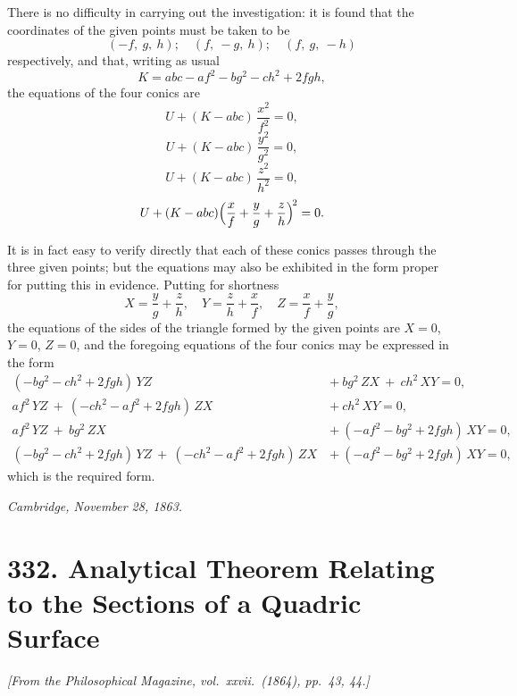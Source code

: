 \documentclass[11pt,a4paper]{article}
\theoremstyle{plain}
\begin{document}
There is no difficulty in carrying out the investigation: it is found that the coordinates of the given points must be taken to be
\[
(-f,\ g,\ h);\quad (f,\ -g,\ h);\quad (f,\ g,\ -h)
\]
respectively, and that, writing as usual
\[
K = abc - af^2 - bg^2 - ch^2 + 2fgh,
\]
the equations of the four conics are
\[
U + (K - abc)\,\frac{x^2}{f^2} = 0,
\]
\[
U + (K - abc)\,\frac{y^2}{g^2} = 0,
\]
\[
U + (K - abc)\,\frac{z^2}{h^2} = 0,
\]
\[
U + (K - abc)\Bigl(\frac{x}{f} + \frac{y}{g} + \frac{z}{h}\Bigr)^{\!2} = 0.
\]

It is in fact easy to verify directly that each of these conics passes through the three given points; but the equations may also be exhibited in the form proper for putting this in evidence. Putting for shortness
\[
X = \frac{y}{g} + \frac{z}{h},\quad Y = \frac{z}{h} + \frac{x}{f},\quad Z = \frac{x}{f} + \frac{y}{g},
\]
the equations of the sides of the triangle formed by the given points are $X = 0$, $Y = 0$, $Z = 0$, and the foregoing equations of the four conics may be expressed in the form
\begin{align*}
(-bg^2 - ch^2 + 2fgh)\,YZ\ &+\ bg^2\,ZX\ +\ ch^2\,XY = 0,\\[2pt]
af^2\,YZ\ +\ (-ch^2 - af^2 + 2fgh)\,ZX\ &+\ ch^2\,XY = 0,\\[2pt]
af^2\,YZ\ +\ bg^2\,ZX\ &+\ (-af^2 - bg^2 + 2fgh)\,XY = 0,\\[2pt]
(-bg^2 - ch^2 + 2fgh)\,YZ\ +\ (-ch^2 - af^2 + 2fgh)\,ZX\ &+\ (-af^2 - bg^2 + 2fgh)\,XY = 0,
\end{align*}
which is the required form.

\medskip
\noindent\textit{Cambridge, November 28, 1863.}

\newpage
\section*{332. Analytical Theorem Relating to the Sections of a Quadric Surface}

\noindent\textit{[From the Philosophical Magazine, vol.\ xxvii.\ (1864), pp.\ 43, 44.]}

\medskip
\end{document}
